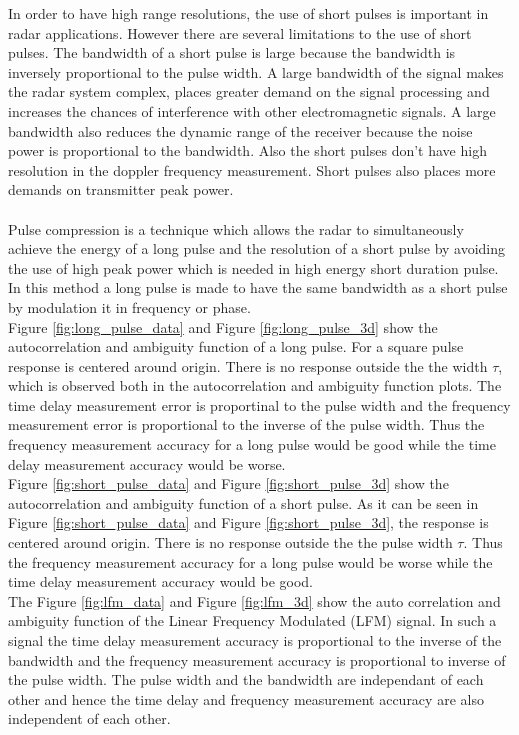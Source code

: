 \documentclass{article}
\begin{document}
In order to have high range resolutions, the use of short pulses is important in radar applications. However there are several limitations to the use of short pulses. The bandwidth of a short pulse is large because the bandwidth is inversely proportional to the pulse width. A large bandwidth of the signal makes the radar system complex, places greater demand on the signal processing and increases the chances of interference with other electromagnetic signals. A large bandwidth also reduces the dynamic range of the receiver because the noise power is proportional to the bandwidth. Also the short pulses don't have high resolution in the doppler frequency measurement. Short pulses also places more demands on transmitter peak power.\cite{Skolnik:2001irs}\\
\\
Pulse compression is a technique which allows the radar to simultaneously achieve the energy of a long pulse and the resolution of a short pulse by avoiding the use of high peak power which is needed in high energy short duration pulse. In this method a long pulse is made to have the same bandwidth as a short pulse by modulation it in frequency or phase.\cite{Skolnik:2001irs}\\

Figure \ref{fig:long_pulse_data} and Figure \ref{fig:long_pulse_3d} show the autocorrelation and ambiguity function of a long pulse. For a square pulse response is centered around origin. There is no response outside the the width $\tau$, which is observed both in the autocorrelation and ambiguity function plots. The time delay measurement error is proportinal to the pulse width and the frequency measurement error is proportional to the inverse of the pulse width. Thus the frequency measurement accuracy for a long pulse would be good while the time delay measurement accuracy would be worse. \cite{Skolnik:2001irs}\\

Figure \ref{fig:short_pulse_data} and Figure \ref{fig:short_pulse_3d} show the autocorrelation and ambiguity function of a short pulse. As it can be seen in Figure \ref{fig:short_pulse_data} and Figure \ref{fig:short_pulse_3d}, the response is centered around origin. There is no response outside the the pulse width $\tau$. Thus the frequency measurement accuracy for a long pulse would be worse while the time delay measurement accuracy would be good. \cite{Skolnik:2001irs}\\

The Figure \ref{fig:lfm_data} and Figure \ref{fig:lfm_3d} show the auto correlation and ambiguity function of the Linear Frequency Modulated (LFM) signal. In such a signal the time delay measurement accuracy is proportional to the inverse of the bandwidth and the frequency measurement accuracy is proportional to inverse of the pulse width.  The pulse width and the bandwidth are independant of each other and hence the time delay and frequency measurement accuracy are also independent of each other.\\
\end{document}
